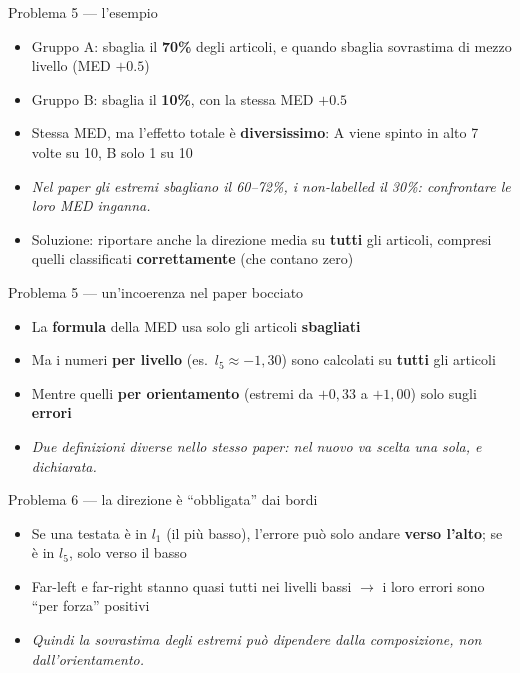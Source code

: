 \documentclass[aspectratio=169]{beamer}
\newcommand{\hl}[1]{\textbf{#1}}
\begin{document}
\begin{frame}{Problema 5 --- l'esempio}
  \vfill
  \begin{itemize}[<+->]
    \setlength\itemsep{0.7em}
    \item Gruppo A: sbaglia il \hl{70\%} degli articoli, e quando sbaglia sovrastima di mezzo livello (MED $+0.5$)
    \item Gruppo B: sbaglia il \hl{10\%}, con la stessa MED $+0.5$
    \item Stessa MED, ma l'effetto totale \`e \hl{diversissimo}: A viene spinto in alto 7 volte su 10, B solo 1 su 10
    \item[] {\small\itshape Nel paper gli estremi sbagliano il 60--72\%, i non-labelled il 30\%: confrontare le loro MED inganna.}
    \item Soluzione: riportare anche la direzione media su \hl{tutti} gli articoli, compresi quelli classificati \hl{correttamente} (che contano zero)
  \end{itemize}
  \vfill
\end{frame}

\begin{frame}{Problema 5 --- un'incoerenza nel paper bocciato}
  \vfill
  \begin{itemize}[<+->]
    \setlength\itemsep{0.9em}
    \item La \hl{formula} della MED usa solo gli articoli \hl{sbagliati}
    \item Ma i numeri \hl{per livello} (es.\ $l_5 \approx -1{,}30$) sono calcolati su \hl{tutti} gli articoli
    \item Mentre quelli \hl{per orientamento} (estremi da $+0{,}33$ a $+1{,}00$) solo sugli \hl{errori}
    \item[] {\small\itshape Due definizioni diverse nello stesso paper: nel nuovo va scelta una sola, e dichiarata.}
  \end{itemize}
  \vfill
\end{frame}

\begin{frame}{Problema 6 --- la direzione \`e ``obbligata'' dai bordi}
  \vfill
  \begin{itemize}[<+->]
    \setlength\itemsep{0.8em}
    \item Se una testata \`e in $l_1$ (il pi\`u basso), l'errore pu\`o solo andare \hl{verso l'alto}; se \`e in $l_5$, solo verso il basso
    \item Far-left e far-right stanno quasi tutti nei livelli bassi $\rightarrow$ i loro errori sono ``per forza'' positivi
    \item[] {\small\itshape Quindi la sovrastima degli estremi pu\`o dipendere dalla composizione, non dall'orientamento.}
  \end{itemize}
  \vfill
\end{frame}
\end{document}
